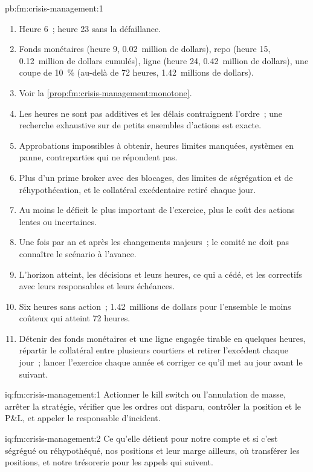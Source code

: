 \begin{solution}{pb:fm:crisis-management:1}
\begin{enumerate}
\item Heure 6~; heure 23 sans la défaillance.
\item Fonds monétaires (heure 9, 0.02~million de dollars), repo (heure 15, 0.12~million de dollars cumulés), ligne (heure 24, 0.42~million de dollars), une coupe de 10~\% (au-delà de 72 heures,
1.42~millions de dollars).
\item Voir la \cref{prop:fm:crisis-management:monotone}.
\item Les heures ne sont pas additives et les délais contraignent l'ordre~; une recherche exhaustive sur de petits ensembles d'actions est exacte.
\item Approbations impossibles à obtenir, heures limites manquées, systèmes en panne, contreparties qui ne répondent pas.
\item Plus d'un prime broker avec des blocages, des limites de ségrégation et de réhypothécation, et le collatéral excédentaire retiré chaque jour.
\item Au moins le déficit le plus important de l'exercice, plus le coût des actions lentes ou incertaines.
\item Une fois par an et après les changements majeurs~; le comité ne doit pas connaître le scénario à l'avance.
\item L'horizon atteint, les décisions et leurs heures, ce qui a cédé, et les correctifs avec leurs responsables et leurs échéances.
\item Six heures sans action~; 1.42~millions de dollars pour l'ensemble le moins coûteux qui atteint 72 heures.
\item Détenir des fonds monétaires et une ligne engagée tirable en quelques heures, répartir le collatéral entre plusieurs courtiers et retirer l'excédent chaque jour~;
lancer l'exercice chaque année et corriger ce qu'il met au jour avant le suivant.
\end{enumerate}
\end{solution}

\begin{solution}{iq:fm:crisis-management:1}
Actionner le kill switch ou l'annulation de masse, arrêter la stratégie, vérifier que les ordres ont disparu, contrôler la position et le P\&L, et appeler le responsable d'incident.
\end{solution}

\begin{solution}{iq:fm:crisis-management:2}
Ce qu'elle détient pour notre compte et si c'est ségrégué ou réhypothéqué, nos positions et leur marge ailleurs, où transférer les positions, et notre trésorerie
pour les appels qui suivent.
\end{solution}

